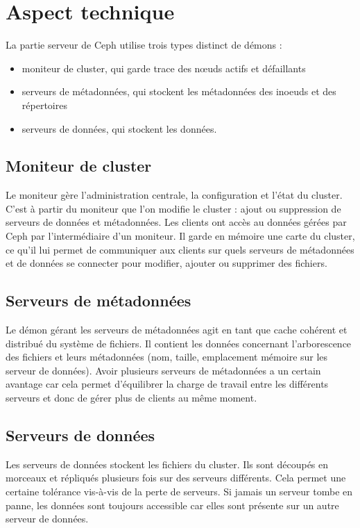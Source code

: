 \documentclass[12pt]{report}
\begin{document}
                \section{Aspect technique}
                        
                        La partie serveur de Ceph utilise trois types distinct de démons : 
                        \begin{itemize}
                          \item moniteur de cluster, qui garde trace des nœuds actifs et défaillants
                          \item serveurs de métadonnées, qui stockent les métadonnées des inoeuds et des répertoires
                          \item serveurs de données, qui stockent les données.
                        \end{itemize}

                        \subsection{Moniteur de cluster}
                           Le moniteur gère l'administration centrale, la configuration et l'état du cluster. C'est à partir du moniteur que l'on modifie le cluster : ajout ou suppression de serveurs de données et métadonnées. Les clients ont accès au données gérées par Ceph par l'intermédiaire d'un moniteur. Il garde en mémoire une carte du cluster, ce qu'il lui permet de communiquer aux clients sur quels serveurs de métadonnées et de données se connecter pour modifier, ajouter ou supprimer des fichiers.

                        \subsection{Serveurs de métadonnées}
                           Le démon gérant les serveurs de métadonnées agit en tant que cache cohérent et distribué du système de fichiers. Il contient les données concernant l'arborescence des fichiers et leurs métadonnées (nom, taille, emplacement mémoire sur les serveur de données). Avoir plusieurs serveurs de métadonnées a un certain avantage car cela permet d'équilibrer la charge de travail entre les différents serveurs et donc de gérer plus de clients au même moment.

                        \subsection{Serveurs de données}
                           Les serveurs de données stockent les fichiers du cluster. Ils sont découpés en morceaux et répliqués plusieurs fois sur des serveurs différents. Cela permet une certaine tolérance vis-à-vis de la perte de serveurs. Si jamais un serveur tombe en panne, les données sont toujours accessible car elles sont présente sur un autre serveur de données.
\end{document}
